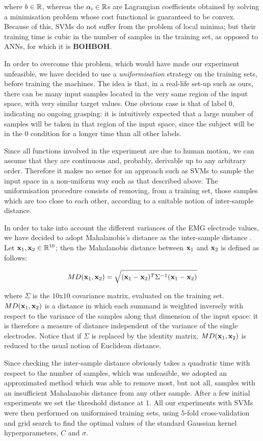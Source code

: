 \noindent where $b \in \mathbb{R}$, whereas the $\alpha_i \in \mathbb{R}$s are
Lagrangian coefficients obtained by solving a minimisation problem
whose cost functional is guaranteed to be convex. Because of this,
SVMs do not suffer from the problem of local minima; but their
training time is cubic in the number of samples in the training set,
as opposed to ANNs, for which it is \textbf{BOHBOH}.

In order to overcome this problem, which would have made our
experiment unfeasible, we have decided to use a \emph{uniformisation}
strategy on the training sets, before training the machines. The idea
is that, in a real-life set-up such as ours, there can be many input
samples located in the very same region of the input space, with very
similar target values. One obvious case is that of label $0$,
indicating no ongoing grasping: it is intuitively expected that a
large number of samples will be taken in that region of the input
space, since the subject will be in the $0$ condition for a longer
time than all other labels.

Since all functions involved in the experiment are due to human
motion, we can assume that they are continuous and, probably,
derivable up to any arbitrary order. Therefore it makes no sense for
an approach such as SVMs to sample the input space in a non-uniform
way such as that described above. The uniformisation procedure
consists of removing, from a training set, those samples which are too
close to each other, according to a suitable notion of inter-sample
distance.

In order to take into account the different variances of the EMG
electrode values, we have decided to adopt Mahalanobis's distance as
the inter-sample distance \cite{...}. Let $\mathbf{x}_1, \mathbf{x}_2 \in \mathbb{R}^{10}$;
then the Mahalanobis distance between $\mathbf{x}_1$ and $\mathbf{x}_2$ is defined
as follows:

$$ MD(\mathbf{x}_1,\mathbf{x}_2) = \sqrt{(\mathbf{x}_1-\mathbf{x}_2)^T \Sigma^{-1} (\mathbf{x}_1-\mathbf{x}_2)} $$

\noindent where $\Sigma$ is the $10$x$10$ covariance matrix, evaluated
on the training set. $MD(\mathbf{x}_1,\mathbf{x}_2)$ is a distance in which each
summand is weighted inversely with respect to the variance of the
samples along that dimension of the input space: it is therefore a
measure of distance independent of the variance of the single
electrodes. Notice that if $\Sigma$ is replaced by the identity
matrix, $MD(\mathbf{x}_1,\mathbf{x}_2)$ is reduced to the usual notion of Euclidean
distance.

Since checking the inter-sample distance obviously takes a quadratic
time with respect to the number of samples, which was unfeasible, we
adopted an approximated method which was able to remove most, but not
all, samples with an insufficient Mahalanobis distance from any other
sample. After a few initial experiments we set the threshold distance
at $1$. All our experiments with SVMs were then performed on
uniformised training sets, using $5$-fold cross-validation and grid
search to find the optimal values of the standard Gaussian kernel
hyperparameters, $C$ and $\sigma$.

